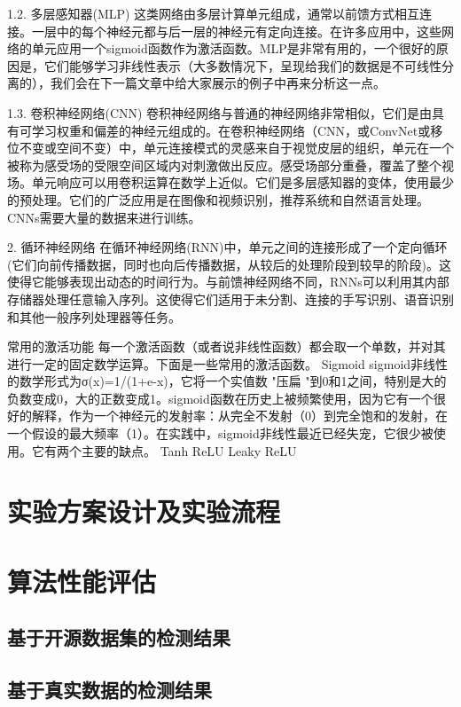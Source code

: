 1.2. 多层感知器(MLP)
这类网络由多层计算单元组成，通常以前馈方式相互连接。一层中的每个神经元都与后一层的神经元有定向连接。在许多应用中，这些网络的单元应用一个sigmoid函数作为激活函数。MLP是非常有用的，一个很好的原因是，它们能够学习非线性表示（大多数情况下，呈现给我们的数据是不可线性分离的），我们会在下一篇文章中给大家展示的例子中再来分析这一点。

1.3. 卷积神经网络(CNN)
卷积神经网络与普通的神经网络非常相似，它们是由具有可学习权重和偏差的神经元组成的。在卷积神经网络（CNN，或ConvNet或移位不变或空间不变）中，单元连接模式的灵感来自于视觉皮层的组织，单元在一个被称为感受场的受限空间区域内对刺激做出反应。感受场部分重叠，覆盖了整个视场。单元响应可以用卷积运算在数学上近似。它们是多层感知器的变体，使用最少的预处理。它们的广泛应用是在图像和视频识别，推荐系统和自然语言处理。CNNs需要大量的数据来进行训练。

2. 循环神经网络
在循环神经网络(RNN)中，单元之间的连接形成了一个定向循环(它们向前传播数据，同时也向后传播数据，从较后的处理阶段到较早的阶段)。这使得它能够表现出动态的时间行为。与前馈神经网络不同，RNNs可以利用其内部存储器处理任意输入序列。这使得它们适用于未分割、连接的手写识别、语音识别和其他一般序列处理器等任务。

常用的激活功能
每一个激活函数（或者说非线性函数）都会取一个单数，并对其进行一定的固定数学运算。下面是一些常用的激活函数。
Sigmoid
sigmoid非线性的数学形式为σ(x)=1/(1+e-x)，它将一个实值数 "压扁 "到0和1之间，特别是大的负数变成0，大的正数变成1。sigmoid函数在历史上被频繁使用，因为它有一个很好的解释，作为一个神经元的发射率：从完全不发射（0）到完全饱和的发射，在一个假设的最大频率（1）。在实践中，sigmoid非线性最近已经失宠，它很少被使用。它有两个主要的缺点。
Tanh
ReLU
Leaky ReLU

\section{实验方案设计及实验流程}

\section{算法性能评估}

\subsection{基于开源数据集的检测结果}

\subsection{基于真实数据的检测结果}